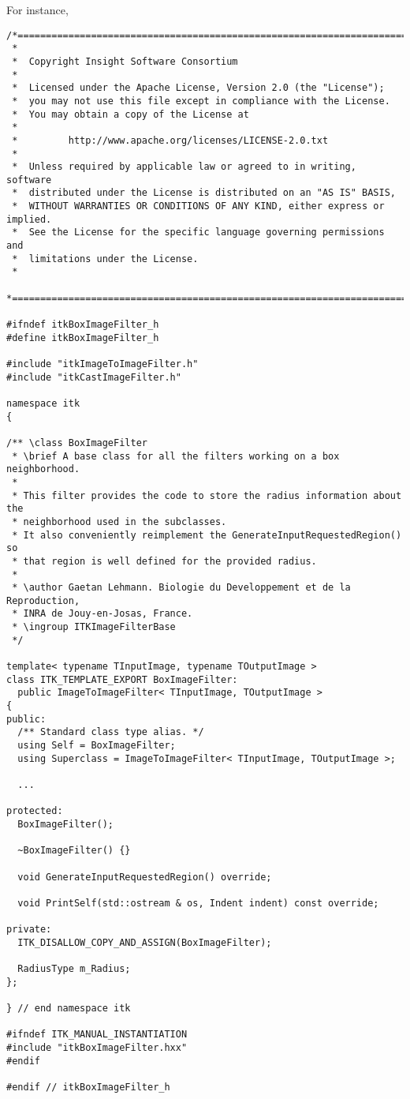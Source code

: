 For instance,

\small
\begin{verbatim}
/*=========================================================================
 *
 *  Copyright Insight Software Consortium
 *
 *  Licensed under the Apache License, Version 2.0 (the "License");
 *  you may not use this file except in compliance with the License.
 *  You may obtain a copy of the License at
 *
 *         http://www.apache.org/licenses/LICENSE-2.0.txt
 *
 *  Unless required by applicable law or agreed to in writing, software
 *  distributed under the License is distributed on an "AS IS" BASIS,
 *  WITHOUT WARRANTIES OR CONDITIONS OF ANY KIND, either express or implied.
 *  See the License for the specific language governing permissions and
 *  limitations under the License.
 *
 *=========================================================================*/

#ifndef itkBoxImageFilter_h
#define itkBoxImageFilter_h

#include "itkImageToImageFilter.h"
#include "itkCastImageFilter.h"

namespace itk
{

/** \class BoxImageFilter
 * \brief A base class for all the filters working on a box neighborhood.
 *
 * This filter provides the code to store the radius information about the
 * neighborhood used in the subclasses.
 * It also conveniently reimplement the GenerateInputRequestedRegion() so
 * that region is well defined for the provided radius.
 *
 * \author Gaetan Lehmann. Biologie du Developpement et de la Reproduction,
 * INRA de Jouy-en-Josas, France.
 * \ingroup ITKImageFilterBase
 */

template< typename TInputImage, typename TOutputImage >
class ITK_TEMPLATE_EXPORT BoxImageFilter:
  public ImageToImageFilter< TInputImage, TOutputImage >
{
public:
  /** Standard class type alias. */
  using Self = BoxImageFilter;
  using Superclass = ImageToImageFilter< TInputImage, TOutputImage >;

  ...

protected:
  BoxImageFilter();

  ~BoxImageFilter() {}

  void GenerateInputRequestedRegion() override;

  void PrintSelf(std::ostream & os, Indent indent) const override;

private:
  ITK_DISALLOW_COPY_AND_ASSIGN(BoxImageFilter);

  RadiusType m_Radius;
};

} // end namespace itk

#ifndef ITK_MANUAL_INSTANTIATION
#include "itkBoxImageFilter.hxx"
#endif

#endif // itkBoxImageFilter_h
\end{verbatim}
\normalsize

